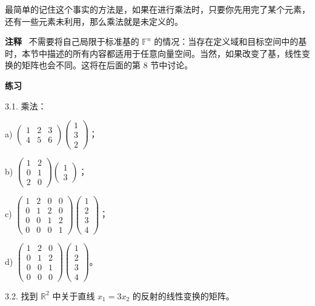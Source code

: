 最简单的记住这个事实的方法是，如果在进行乘法时，只要你先用完了某个元素，还有一些元素未利用，那么乘法就是未定义的。

\textbf{注释}~ 不需要将自己局限于标准基的 $\mathbb{F}^n$ 的情况：当存在定义域和目标空间中的基时，本节中描述的所有内容都适用于任意向量空间。当然，如果改变了基，线性变换的矩阵也会不同。这将在后面的第 8 节中讨论。


\textbf{练习}~

3.1. 乘法：

a) $\begin{pmatrix} 1 & 2 & 3 \\ 4 & 5 & 6 \end{pmatrix} \begin{pmatrix} 1 \\ 3 \\ 2 \end{pmatrix}$；

b) $\begin{pmatrix} 1 & 2 \\ 0 & 1 \\ 2 & 0 \end{pmatrix} \begin{pmatrix} 1 \\ 3 \end{pmatrix}$；

c) $\begin{pmatrix} 1 & 2 & 0 & 0 \\ 0 & 1 & 2 & 0 \\ 0 & 0 & 1 & 2 \\ 0 & 0 & 0 & 1 \end{pmatrix} \begin{pmatrix} 1 \\ 2 \\ 3 \\ 4 \end{pmatrix}$；

d) $\begin{pmatrix} 1 & 2 & 0 \\ 0 & 1 & 2 \\ 0 & 0 & 1 \\ 0 & 0 & 0 \end{pmatrix} \begin{pmatrix} 1 \\ 2 \\ 3 \\ 4 \end{pmatrix}$。

3.2. 找到 $\mathbb{R}^2$ 中关于直线 $x_1 = 3x_2$ 的反射的线性变换的矩阵。

